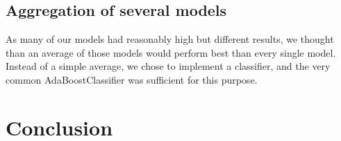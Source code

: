 \documentclass[10pt,conference,compsocconf]{IEEEtran}
\begin{document}
\subsection{Aggregation of several models}

As many of our models had reasonably high but different results, we thought than an average of those models would perform best than every single model. Instead of a simple average, we chose to implement a classifier, and the very common AdaBoostClassifier was sufficient for this purpose.

\section{Conclusion}
\end{document}
